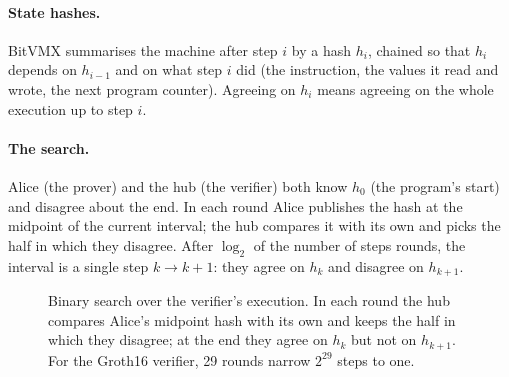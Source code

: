 \documentclass[11pt]{article}
\begin{document}
\paragraph{State hashes.} BitVMX summarises the machine after step $i$
by a hash $h_i$, chained so that $h_i$ depends on $h_{i-1}$ and on what
step $i$ did (the instruction, the values it read and wrote, the next
program counter). Agreeing on $h_i$ means agreeing on the whole
execution up to step $i$.

\paragraph{The search.} Alice (the prover) and the hub (the verifier)
both know $h_0$ (the program's start) and disagree about the end. In
each round Alice publishes the hash at the midpoint of the current
interval; the hub compares it with its own and picks the half in which
they disagree. After $\log_2$ of the number of steps rounds, the
interval is a single step $k \to k+1$: they agree on $h_k$ and disagree
on $h_{k+1}$.

\begin{figure}[H]
\centering
{}
\caption{Binary search over the verifier's execution. In each round the
hub compares Alice's midpoint hash with its own and keeps the half in
which they disagree; at the end they agree on $h_k$ but not on
$h_{k+1}$. For the Groth16 verifier,
29 rounds narrow $2^{29}$ steps to one.}
\label{fig:bisection}
\end{figure}
\end{document}
